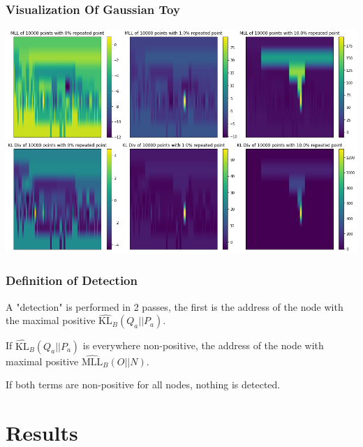 \documentclass{beamer}
\begin{document}
\begin{frame}
    \frametitle{Visualization Of Gaussian Toy}
    \begin{center}
        \includegraphics[scale=0.3]{tree_val_plot_10000_minus_baseline.png}
    \end{center}
\end{frame}

\begin{frame}
    \frametitle{Definition of Detection}
    A "detection" is performed in 2 passes, the first is the address of the node with the maximal positive $\widehat{\text{KL}}_B(Q_a|| P_a)$.
    
    If $\widehat{\text{KL}}_B(Q_a|| P_a)$ is everywhere non-positive, the address of the node with maximal positive $\widehat{\text{MLL}}_B(O|| N)$.
    
    If both terms are non-positive for all nodes, nothing is detected. 
\end{frame}

\section{Results}
\end{document}
